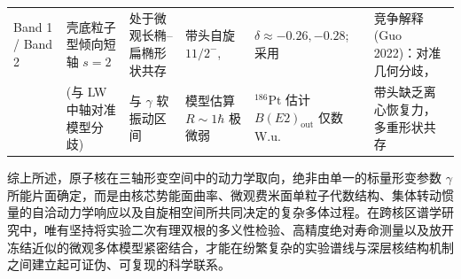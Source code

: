\begin{table}[!htbp]
\begin{tabularx}{\textwidth}{lXXXXX}
Band 1 / Band 2 & 壳底粒子型倾向短轴 $s=2$ & 处于微观长椭--扁椭形状共存 & 带头自旋 $11/2^-$, & $\delta \approx -0.26, -0.28$; 采用 & 竞争解释 (Guo 2022)：对准几何分歧， \\
& (与 LW 中轴对准模型分歧) & 与 $\gamma$ 软振动区间 & 模型估算 $R \sim 1\hbar$ 极微弱 & $^{186}\mathrm{Pt}$ 估计 $B(E2)_{\mathrm{out}}$ 仅数 W.u. & 带头缺乏离心恢复力，多重形状共存 \\
\hline\hline
\end{tabularx}
\end{table}

综上所述，原子核在三轴形变空间中的动力学取向，绝非由单一的标量形变参数 $\gamma$ 所能片面确定，而是由核芯势能面曲率、微观费米面单粒子代数结构、集体转动惯量的自洽动力学响应以及自旋相空间所共同决定的复杂多体过程。在跨核区谱学研究中，唯有坚持将实验二次有理双根的多义性检验、高精度绝对寿命测量以及放开冻结近似的微观多体模型紧密结合，才能在纷繁复杂的实验谱线与深层核结构机制之间建立起可证伪、可复现的科学联系。
